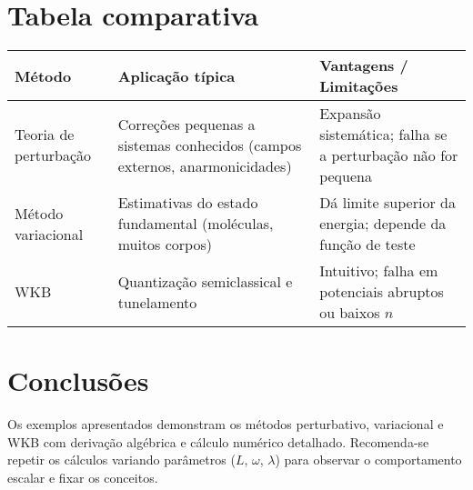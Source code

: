 \documentclass[12pt]{article}
\begin{document}
\section{Tabela comparativa}
\begin{center}
\begin{tabular}{|l|p{6.5cm}|p{5.5cm}|}
\hline
Método & Aplicação típica & Vantagens / Limitações \\
\hline
Teoria de perturbação & Correções pequenas a sistemas conhecidos (campos externos, anarmonicidades) & Expansão sistemática; falha se a perturbação não for pequena \\
\hline
Método variacional & Estimativas do estado fundamental (moléculas, muitos corpos) & Dá limite superior da energia; depende da função de teste \\
\hline
WKB & Quantização semiclassical e tunelamento & Intuitivo; falha em potenciais abruptos ou baixos $n$ \\
\hline
\end{tabular}
\end{center}

\section{Conclusões}
Os exemplos apresentados demonstram os métodos perturbativo, variacional e WKB com derivação algébrica e cálculo numérico detalhado. Recomenda-se repetir os cálculos variando parâmetros ($L$, $\omega$, $\lambda$) para observar o comportamento escalar e fixar os conceitos.
\end{document}
